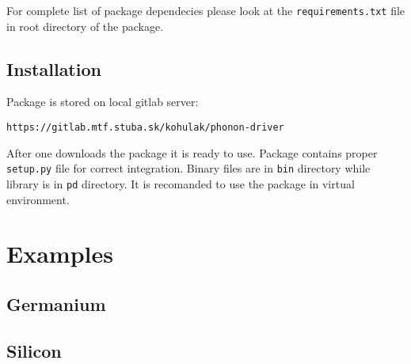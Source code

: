 \documentclass[12pt]{article}
\begin{document}
For complete list of package dependecies please look at the \texttt{requirements.txt} file in root directory of the package. 

\subsection{Installation}

Package is stored on local gitlab server:
\begin{verbatim}
https://gitlab.mtf.stuba.sk/kohulak/phonon-driver
\end{verbatim}
After one downloads the package it is ready to use. Package contains proper \texttt{setup.py} file for correct integration. Binary files are in \texttt{bin} directory while library is in \texttt{pd} directory. It is recomanded to use the package in virtual environment.

\section{Examples}

\subsection{Germanium}

\subsection{Silicon}

\printbibliography
\end{document}
